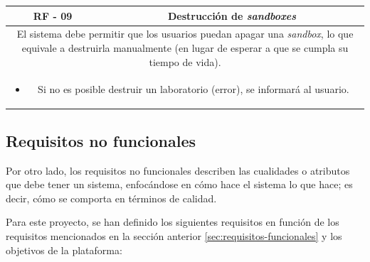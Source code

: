                 \begin{table}[!htbp]
                    \centering
                    \begin{tabular}{|c|c|}
                        \hline
                        \textbf{RF - 09} & \textbf{Destrucción de \textit{sandboxes}} \\
                        \hline
                        \multicolumn{2}{|p{15cm}|}{
                            El sistema debe permitir que los usuarios puedan apagar una \textit{sandbox}, lo que equivale a destruirla manualmente (en lugar de esperar a que se cumpla su tiempo de vida).
                        } \\
                        \hline
                        \multicolumn{2}{|p{15cm}|}{
                            \begin{itemize}
                                \item Si no es posible destruir un laboratorio (error), se informará al usuario.
                            \end{itemize}
                            } \\
                        \hline
                    \end{tabular}
                    \label{tab:RF09}
                \end{table}
                
                \newpage
        
        
        \subsection{Requisitos no funcionales}
            \label{sec:requisitos-nofuncionales}
            
            Por otro lado, los requisitos no funcionales describen las cualidades o atributos que debe tener un sistema, enfocándose en cómo hace el sistema lo que hace; es decir, cómo se comporta en términos de calidad.
            
            Para este proyecto, se han definido los siguientes requisitos en función de los requisitos mencionados en la sección anterior \ref{sec:requisitos-funcionales} y los objetivos de la plataforma:
            
